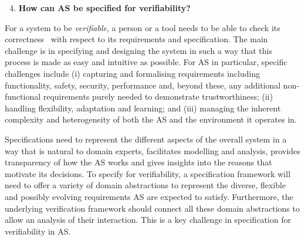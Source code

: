 \documentclass[sigconf,nonacm]{acmart}%
\begin{document}
	\begin{enumerate}[leftmargin=0.5cm]
		\setcounter{enumi}{3}
		\item \textbf{How can AS be specified for verifiability?}
	\end{enumerate}
	For a system to be {\em verifiable\/}, a person or a tool needs to be able to check its correctness~\cite{ISO24765:2017} with respect to its requirements and specification. 
	The main challenge is in specifying and designing the system in such a way that this process is made as easy and intuitive as possible.
	For AS in particular, specific challenges include 
	(i) capturing and formalising requirements including functionality, safety, security, performance and, beyond these, any additional non-functional requirements purely needed to demonstrate trustworthiness; 
	(ii) handling flexibility, adaptation and learning; and 
	(iii) managing the inherent complexity and heterogeneity of both the AS and the environment it operates in. 
	
	Specifications need to represent the different aspects of the overall system in a way that is natural to domain experts, facilitates modelling and analysis, provides transparency of how the AS works and gives insights into the reasons that motivate its decisions. 
	To specify for verifiability, a specification framework will need to offer a variety of domain abstractions to represent the diverse, flexible and possibly evolving requirements AS are expected to satisfy. 
	Furthermore, the underlying verification framework should connect all these domain abstractions to allow an analysis of their interaction. This is a key challenge in specification for verifiability in AS.
	
\end{document}
